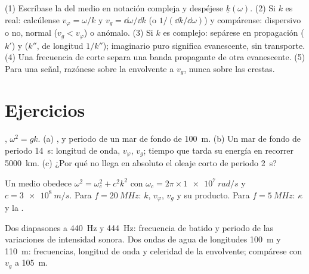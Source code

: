 \begin{method}\label{met:b2:dispersion-wave-packets:method}
(1) Escríbase la  del medio en notación compleja y
despéjese $\underline k(\omega)$. (2) Si $k$ es real: calcúlense $v_\varphi = \omega/k$
y $v_g = \dd\omega/\dd k$ (o $1/(\dd k/\dd\omega)$) y compárense: dispersivo o
no, normal ($v_g < v_\varphi$) o anómalo. (3) Si $k$ es complejo: sepárese en
propagación ($k'$) y  ($k''$, de longitud $1/k''$); imaginario
puro significa evanescente, sin transporte. (4) Una frecuencia de corte
separa una banda propagante de otra evanescente. (5) Para una señal,
razónese sobre la envolvente a $v_g$, nunca sobre las crestas.
\end{method}

\section{Ejercicios}

\begin{exercise}[$\star$]\label{exo:b2:dispersion-wave-packets:1}
, $\omega^2 = gk$. (a) ,  y periodo de un mar de fondo de \qty{100}{m}. (b) Un mar de fondo de
periodo \qty{14}{s}: longitud de onda, $v_\varphi$, $v_g$; tiempo que tarda su
energía en recorrer \qty{5000}{km}. (c) ¿Por qué no llega en absoluto el oleaje corto de periodo \qty{2}{s}?
\end{exercise}

\begin{exercise}[$\star$]\label{exo:b2:dispersion-wave-packets:2}
Un medio obedece $\omega^2 = \omega_c^2 + c^2k^2$ con $\omega_c = 2\pi \times \qty{1e7}{rad/s}$
y $c = \qty{3e8}{m/s}$. Para $f = \qty{20}{MHz}$: $k$, $v_\varphi$, $v_g$ y su
producto. Para $f = \qty{5}{MHz}$: $\kappa$ y la .
\end{exercise}

\begin{exercise}[$\star$]\label{exo:b2:dispersion-wave-packets:3}
Dos diapasones a \qty{440}{Hz} y \qty{444}{Hz}: frecuencia de batido y
periodo de las variaciones de intensidad sonora. Dos ondas de agua de
longitudes \qty{100}{m} y \qty{110}{m}: frecuencias, longitud de onda y
celeridad de la envolvente; compárese con $v_g$ a \qty{105}{m}.
\end{exercise}

